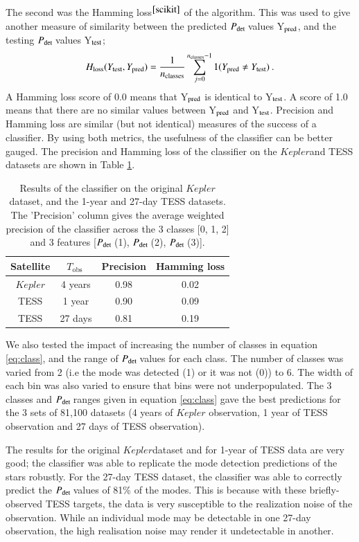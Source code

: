 \documentclass[a4paper,fleqn,usenatbib,useAMS]{mnras}
\newcommand{\kep}{\ensuremath{Kepler}\:}
\newcommand{\pdet}{\ensuremath{P_{\rm det}\:}}
\newcommand{\tobs}{\ensuremath{T_{\textrm{obs}}\:}}
\begin{document}
The second was the Hamming loss$^{\ref{scikit}}$
\citep{wegner_technique_1960} of the algorithm. This was used to give another measure of similarity between the predicted \pdet values Y$_{\rm pred}$, and the testing \pdet values Y$_{\rm test}$;
\begin{equation}
H_{\rm loss}(Y_{\rm test}, Y_{\rm pred}) = \frac{1}{n_{\rm classes}} \sum_{j=0}^{n_{\rm classes}-1} 1(Y_{\rm pred} \neq Y_{\rm test}) \: . 
\end{equation}
A Hamming loss score of 0.0 means that Y$_{\rm pred}$ is identical to Y$_{\rm test}$. A score of 1.0 means that there are no similar values between Y$_{\rm pred}$ and Y$_{\rm test}$. Precision and Hamming loss are similar (but not identical) measures of the success of a classifier. By using both metrics, the usefulness of the classifier can be better gauged. The precision and Hamming loss of the classifier on the \kep and TESS datasets are shown in Table \ref{tab: results}.
\begin{table}
\begin{center}
\begin{tabular}{ |c|c|c|c| }
Satellite & \tobs   & Precision & Hamming loss \\
\hline
\kep      & 4 years & 0.98      & 0.02         \\
TESS      & 1 year  & 0.90      & 0.09         \\
TESS      & 27 days & 0.81      & 0.19         \\
\end{tabular}
\end{center}
\caption{Results of the classifier on the original \kep dataset, and the 1-year and 27-day TESS datasets. The 'Precision' column gives the average weighted precision of the classifier across the 3 classes [0, 1, 2] and 3 features [\pdet(1), \pdet(2), \pdet(3)].}
\label{tab: results}
\end{table}

We also tested the impact of increasing the number of classes in equation \ref{eq:class}, and the range of \pdet values for each class. The number of classes was varied from 2 (i.e the mode was detected (1) or it was not (0)) to 6. The width of each bin was also varied to ensure that bins were not underpopulated. The 3 classes and \pdet ranges given in equation \ref{eq:class} gave the best predictions for the 3 sets of 81,100 datasets (4 years of $Kepler$ observation, 1 year of TESS observation and 27 days of TESS observation). 

The results for the original \kep dataset and for 1-year of TESS data are very good; the classifier was able to replicate the mode detection predictions of the stars robustly. For the 27-day TESS dataset, the classifier was able to correctly predict the \pdet values of 81\% of the modes. This is because with these briefly-observed TESS targets, the data is very susceptible to the realization noise of the observation. While an individual mode may be detectable in one 27-day observation, the high realisation noise may render it undetectable in another.
\end{document}
